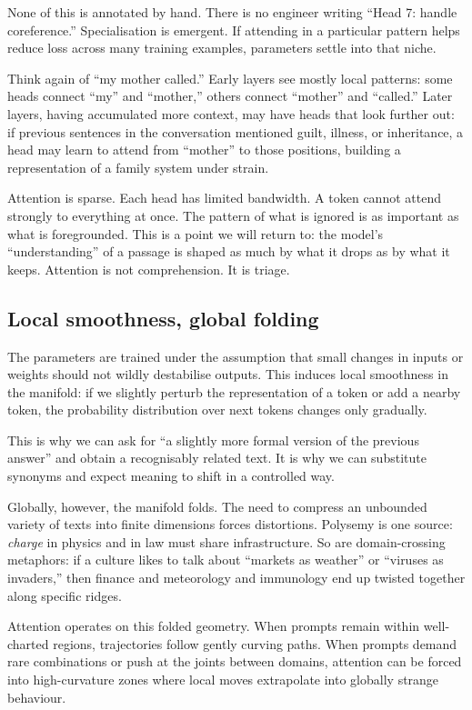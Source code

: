 \documentclass[12pt,a4paper]{book}
\begin{document}
None of this is annotated by hand. There is no engineer writing ``Head 7: handle coreference.'' Specialisation is emergent. If attending in a particular pattern helps reduce loss across many training examples, parameters settle into that niche.

Think again of ``my mother called.'' Early layers see mostly local patterns: some heads connect ``my'' and ``mother,'' others connect ``mother'' and ``called.'' Later layers, having accumulated more context, may have heads that look further out: if previous sentences in the conversation mentioned guilt, illness, or inheritance, a head may learn to attend from ``mother'' to those positions, building a representation of a family system under strain.

Attention is sparse. Each head has limited bandwidth. A token cannot attend strongly to everything at once. The pattern of what is ignored is as important as what is foregrounded. This is a point we will return to: the model's ``understanding'' of a passage is shaped as much by what it drops as by what it keeps. Attention is not comprehension. It is triage.

\subsection*{Local smoothness, global folding}

The parameters are trained under the assumption that small changes in inputs or weights should not wildly destabilise outputs. This induces local smoothness in the manifold: if we slightly perturb the representation of a token or add a nearby token, the probability distribution over next tokens changes only gradually.

This is why we can ask for ``a slightly more formal version of the previous answer'' and obtain a recognisably related text. It is why we can substitute synonyms and expect meaning to shift in a controlled way.

Globally, however, the manifold folds. The need to compress an unbounded variety of texts into finite dimensions forces distortions. Polysemy is one source: \emph{charge} in physics and in law must share infrastructure. So are domain-crossing metaphors: if a culture likes to talk about ``markets as weather'' or ``viruses as invaders,'' then finance and meteorology and immunology end up twisted together along specific ridges.

Attention operates on this folded geometry. When prompts remain within well-charted regions, trajectories follow gently curving paths. When prompts demand rare combinations or push at the joints between domains, attention can be forced into high-curvature zones where local moves extrapolate into globally strange behaviour.
\end{document}
